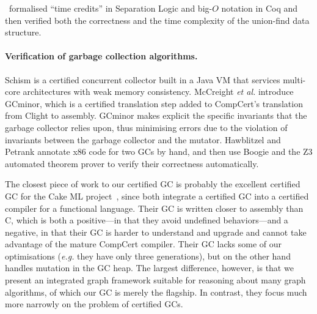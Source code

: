\cite{gueneauetal}~formalised ``time credits'' in Separation Logic and big-$O$ notation in
Coq and then verified both the correctness
and the time complexity of the union-find data structure.

\paragraph{Verification of garbage collection algorithms.}
Schism \cite{gcexample4,gcexample4a} is a certified concurrent
collector built in a Java VM that services multi-core architectures with weak memory consistency.
McCreight \emph{et al.} \cite{gcexample5, gcexample3} introduce GCminor, which is
a certified translation step added to CompCert's translation from Clight to assembly.
GCminor makes explicit the specific invariants that the garbage collector
relies upon, thus minimising errors due to the violation of invariants
between the garbage collector and the mutator.
Hawblitzel and Petrank \cite{gcexample2} annotate x86 code
for two GCs by hand, and then use Boogie and the Z3 automated theorem prover
to verify their correctness automatically.

The closest piece of work to our certified GC is probably the excellent certified GC
for the Cake ML project~\cite{cakemlgc}, since both integrate a certified GC into 
a certified compiler for a functional language.  Their GC is written closer to assembly 
than C, which is both a positive---in that they avoid undefined behaviors---and a negative, 
in that their GC is harder to understand and upgrade and cannot take advantage of the
mature CompCert compiler.  Their GC lacks some of our optimisations (\emph{e.g.} they have 
only three generations), but on the other hand handles mutation in the GC heap.  The largest 
difference, however, is that we present an integrated graph framework suitable for reasoning 
about many graph algorithms, of which our GC is merely the flagship.  In contrast, they focus 
much more narrowly on the problem of certified GCs.





